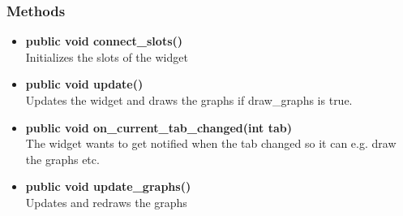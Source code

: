 \subsubsection{Methods}
\begin{itemize}
  \item \textbf{public void connect\_slots()}\\
  Initializes the slots of the widget
  \item \textbf{public void update()}\\
  Updates the widget and draws the graphs if draw\_graphs is true. 
  \item \textbf{public void on\_current\_tab\_changed(int tab)}\\
  The widget wants to get notified when the tab changed so it can e.g. draw the graphs etc.
  \item \textbf{public void update\_graphs()}\\
  Updates and redraws the graphs
\end{itemize}

\newpage
